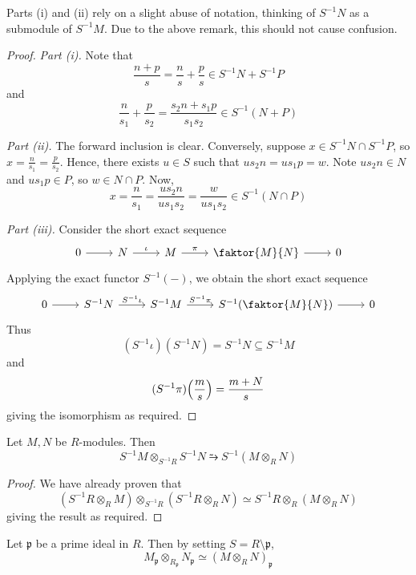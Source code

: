 Parts (i) and (ii) rely on a slight abuse of notation, thinking of \( S^{-1}N \) as a submodule of \( S^{-1}M \).
Due to the above remark, this should not cause confusion.
\begin{proof}
    \emph{Part (i).}
    Note that
    \[ \frac{n+p}{s} = \frac{n}{s} + \frac{p}{s} \in S^{-1}N + S^{-1}P \]
    and
    \[ \frac{n}{s_1} + \frac{p}{s_2} = \frac{s_2 n + s_1 p}{s_1 s_2} \in S^{-1}(N + P) \]
    
    \emph{Part (ii).}
    The forward inclusion is clear.
    Conversely, suppose \( x \in S^{-1}N \cap S^{-1}P \), so \( x = \frac{n}{s_1} = \frac{p}{s_2} \).
    Hence, there exists \( u \in S \) such that \( u s_2 n = u s_1 p = w \).
    Note \( u s_2 n \in N \) and \( u s_1 p \in P \), so \( w \in N \cap P \).
    Now,
    \[ x = \frac{n}{s_1} = \frac{us_2 n}{u s_1 s_2} = \frac{w}{u s_1 s_2} \in S^{-1}(N \cap P) \]
    
    \emph{Part (iii).}
    Consider the short exact sequence
\[\begin{tikzcd}
	0 & N & M & {\faktor{M}{N}} & 0
	\arrow[from=1-1, to=1-2]
	\arrow["\iota", from=1-2, to=1-3]
	\arrow["\pi", from=1-3, to=1-4]
	\arrow[from=1-4, to=1-5]
\end{tikzcd}\]
    Applying the exact functor \( S^{-1}(-) \), we obtain the short exact sequence
\[\begin{tikzcd}
	0 & {S^{-1}N} & {S^{-1}M} & {S^{-1}\qty(\faktor{M}{N})} & 0
	\arrow[from=1-1, to=1-2]
	\arrow["{S^{-1}\iota}", from=1-2, to=1-3]
	\arrow["{S^{-1}\pi}", from=1-3, to=1-4]
	\arrow[from=1-4, to=1-5]
\end{tikzcd}\]
    Thus
    \[ (S^{-1}\iota)(S^{-1}N) = S^{-1}N \subseteq S^{-1}M \]
    and
    \[ (S^{-1}\pi)\qty(\frac{m}{s}) = \frac{m+N}{s} \]
    giving the isomorphism as required.
\end{proof}
\begin{proposition}
    Let \( M, N \) be \( R \)-modules.
    Then
    \[ S^{-1}M \otimes_{S^{-1}R} S^{-1}N \similarrightarrow S^{-1}(M \otimes_R N) \]
\end{proposition}
\begin{proof}
    We have already proven that
    \[ (S^{-1}R \otimes_R M) \otimes_{S^{-1}R} (S^{-1}R \otimes_R N) \simeq S^{-1}R \otimes_R (M \otimes_R N) \]
    giving the result as required.
\end{proof}
\begin{example}
    Let \( \mathfrak p \) be a prime ideal in \( R \).
    Then by setting \( S = R \setminus \mathfrak p \),
    \[ M_{\mathfrak p} \otimes_{R_{\mathfrak p}} N_{\mathfrak p} \simeq (M \otimes_R N)_{\mathfrak p} \]
\end{example}

